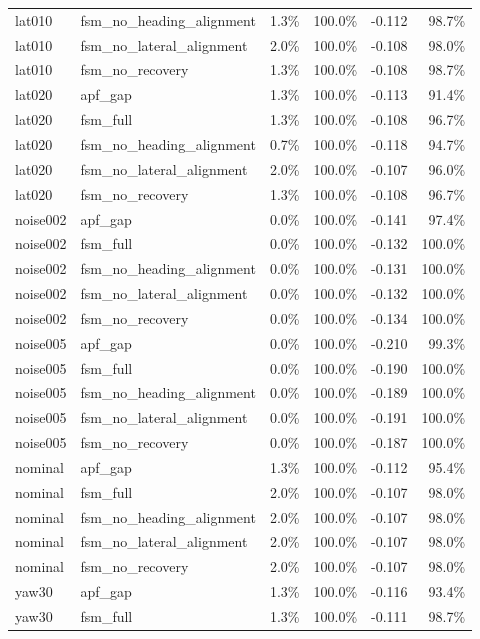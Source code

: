 \begin{tabular}{llrrrr}
lat010 & fsm\_no\_heading\_alignment & 1.3\% & 100.0\% & -0.112 & 98.7\% \\
lat010 & fsm\_no\_lateral\_alignment & 2.0\% & 100.0\% & -0.108 & 98.0\% \\
lat010 & fsm\_no\_recovery & 1.3\% & 100.0\% & -0.108 & 98.7\% \\
lat020 & apf\_gap & 1.3\% & 100.0\% & -0.113 & 91.4\% \\
lat020 & fsm\_full & 1.3\% & 100.0\% & -0.108 & 96.7\% \\
lat020 & fsm\_no\_heading\_alignment & 0.7\% & 100.0\% & -0.118 & 94.7\% \\
lat020 & fsm\_no\_lateral\_alignment & 2.0\% & 100.0\% & -0.107 & 96.0\% \\
lat020 & fsm\_no\_recovery & 1.3\% & 100.0\% & -0.108 & 96.7\% \\
noise002 & apf\_gap & 0.0\% & 100.0\% & -0.141 & 97.4\% \\
noise002 & fsm\_full & 0.0\% & 100.0\% & -0.132 & 100.0\% \\
noise002 & fsm\_no\_heading\_alignment & 0.0\% & 100.0\% & -0.131 & 100.0\% \\
noise002 & fsm\_no\_lateral\_alignment & 0.0\% & 100.0\% & -0.132 & 100.0\% \\
noise002 & fsm\_no\_recovery & 0.0\% & 100.0\% & -0.134 & 100.0\% \\
noise005 & apf\_gap & 0.0\% & 100.0\% & -0.210 & 99.3\% \\
noise005 & fsm\_full & 0.0\% & 100.0\% & -0.190 & 100.0\% \\
noise005 & fsm\_no\_heading\_alignment & 0.0\% & 100.0\% & -0.189 & 100.0\% \\
noise005 & fsm\_no\_lateral\_alignment & 0.0\% & 100.0\% & -0.191 & 100.0\% \\
noise005 & fsm\_no\_recovery & 0.0\% & 100.0\% & -0.187 & 100.0\% \\
nominal & apf\_gap & 1.3\% & 100.0\% & -0.112 & 95.4\% \\
nominal & fsm\_full & 2.0\% & 100.0\% & -0.107 & 98.0\% \\
nominal & fsm\_no\_heading\_alignment & 2.0\% & 100.0\% & -0.107 & 98.0\% \\
nominal & fsm\_no\_lateral\_alignment & 2.0\% & 100.0\% & -0.107 & 98.0\% \\
nominal & fsm\_no\_recovery & 2.0\% & 100.0\% & -0.107 & 98.0\% \\
yaw30 & apf\_gap & 1.3\% & 100.0\% & -0.116 & 93.4\% \\
yaw30 & fsm\_full & 1.3\% & 100.0\% & -0.111 & 98.7\% \\

\end{tabular}
